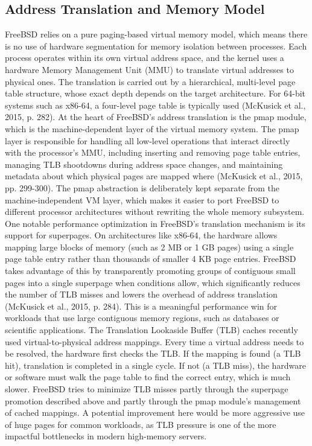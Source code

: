 \subsection{Address Translation and Memory Model}
FreeBSD relies on a pure paging-based virtual memory model, which means there is no use of hardware segmentation for memory isolation between processes. Each process operates within its own virtual address space, and the kernel uses a hardware Memory Management Unit (MMU) to translate virtual addresses to physical ones. The translation is carried out by a hierarchical, multi-level page table structure, whose exact depth depends on the target architecture. For 64-bit systems such as x86-64, a four-level page table is typically used (McKusick et al., 2015, p. 282).
At the heart of FreeBSD's address translation is the pmap module, which is the machine-dependent layer of the virtual memory system. The pmap layer is responsible for handling all low-level operations that interact directly with the processor's MMU, including inserting and removing page table entries, managing TLB shootdowns during address space changes, and maintaining metadata about which physical pages are mapped where (McKusick et al., 2015, pp. 299-300). The pmap abstraction is deliberately kept separate from the machine-independent VM layer, which makes it easier to port FreeBSD to different processor architectures without rewriting the whole memory subsystem.
One notable performance optimization in FreeBSD's translation mechanism is its support for superpages. On architectures like x86-64, the hardware allows mapping large blocks of memory (such as 2 MB or 1 GB pages) using a single page table entry rather than thousands of smaller 4 KB page entries. FreeBSD takes advantage of this by transparently promoting groups of contiguous small pages into a single superpage when conditions allow, which significantly reduces the number of TLB misses and lowers the overhead of address translation (McKusick et al., 2015, p. 284). This is a meaningful performance win for workloads that use large contiguous memory regions, such as databases or scientific applications.
The Translation Lookaside Buffer (TLB) caches recently used virtual-to-physical address mappings. Every time a virtual address needs to be resolved, the hardware first checks the TLB. If the mapping is found (a TLB hit), translation is completed in a single cycle. If not (a TLB miss), the hardware or software must walk the page table to find the correct entry, which is much slower. FreeBSD tries to minimize TLB misses partly through the superpage promotion described above and partly through the pmap module's management of cached mappings. A potential improvement here would be more aggressive use of huge pages for common workloads, as TLB pressure is one of the more impactful bottlenecks in modern high-memory servers.

